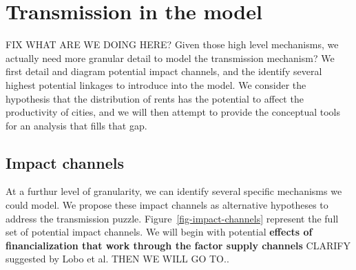 



\section{Transmission in the model}

FIX WHAT ARE WE DOING HERE?
Given those high level mechanisms, we actually need more granular detail to model the transmission mechanism? We first detail and diagram potential impact channels, and the identify several highest potential linkages to introduce into the model. 
We consider the hypothesis that the distribution of rents has the potential to affect the productivity of cities, and we will then attempt to provide the conceptual tools for an analysis that fills that gap.

\subsection{Impact channels}

At a furthur level of granularity, we can identify several specific mechanisms we could model. We propose these \glspl{impact channel} as alternative hypotheses to address the transmission puzzle. Figure~\ref{fig-impact-channels} represent the full set of potential impact channels.
We will begin with potential \textbf{effects of financialization  that work through the factor supply channels} CLARIFY suggested by Lobo et al. 
THEN WE WILL GO TO..

